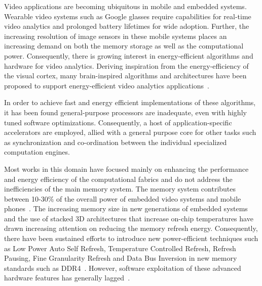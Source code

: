 Video applications are becoming ubiquitous in mobile and embedded systems. Wearable video systems such as Google glasses require capabilities for real-time video analytics and prolonged battery lifetimes for wide adoption.  Further, the increasing resolution of image sensors in these mobile systems places an increasing demand on both the memory storage as well as the computational power. Consequently, there is growing interest in energy-efficient algorithms and hardware for video analytics. 
Deriving inspiration from the energy-efficiency of the visual cortex, many brain-inspired algorithms and architectures have been proposed to support energy-efficient video analytics applications~\cite{Nere2011,Chen2014,Kestur2012,Maashri2012a,Farabet}. %

In order to achieve fast and energy efficient implementations of these algorithms, it has been found general-purpose processors are inadequate, even with highly tuned software optimizations. Consequently, a host of application-specific accelerators are employed, allied with a general purpose core for other tasks such as synchronization and co-ordination between the individual specialized computation engines. 


Most works in this domain have focused mainly on enhancing the performance and energy efficiency of the computational fabrics and do not address the inefficiencies of the main memory system. The memory system contributes between 10-30\% of the overall power of embedded video systems and mobile phones~\cite{CarrollAaronHeiser2010}. 
The increasing memory size in new generations of embedded systems and the use of stacked 3D architectures that increase on-chip temperatures have drawn increasing attention on reducing the memory refresh energy. Consequently, there have been sustained efforts to introduce new power-efficient techniques such as Low Power Auto Self Refresh, Temperature Controlled Refresh, Refresh Pausing, Fine Granularity Refresh and Data Bus Inversion in new memory standards such as DDR4~\cite{jedec-sdram-standards}.  However, software exploitation of these advanced hardware features has generally lagged~\cite{Mukundan2013,refresh-pausing-taco2014}. 

